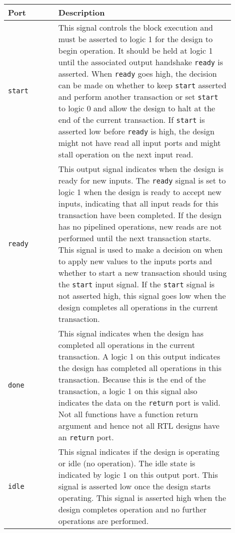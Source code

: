 \begin{table}[H]
\begin{centering}
\begin{tabular}{|p{0.2\linewidth}|p{0.7\linewidth}|}
\hline
\textbf{Port}   & \textbf{Description} \\
\hline
\texttt{start}  &
    This signal controls the block execution and must be asserted to logic 1 for the design to begin operation. It should be held at logic 1 until the associated output handshake \texttt{ready} is asserted. When \texttt{ready} goes high, the decision can be made on whether to keep \texttt{start} asserted and perform another transaction or set \texttt{start} to logic 0 and allow the design to halt at the end of the current transaction. If \texttt{start} is asserted low before \texttt{ready} is high, the design might not have read all input ports and might stall operation on the next input read. \\
\hline
\texttt{ready}  &
    This output signal indicates when the design is ready for new inputs. The \texttt{ready} signal is set to logic 1 when the design is ready to accept new inputs, indicating that all input reads for this transaction have been completed. If the design has no pipelined operations, new reads are not performed until the next transaction starts. This signal is used to make a decision on when to apply new values to the inputs ports and whether to start a new transaction should using the \texttt{start} input signal. If the \texttt{start} signal is not asserted high, this signal goes low when the design completes all operations in the current transaction. \\
\hline
\texttt{done}   &
    This signal indicates when the design has completed all operations in the current transaction. A logic 1 on this output indicates the design has completed all operations in this transaction. Because this is the end of the transaction, a logic 1 on this signal also indicates the data on the \texttt{return} port is valid. Not all functions have a function return argument and hence not all RTL designs have an \texttt{return} port. \\
\hline
\texttt{idle}   & 
    This signal indicates if the design is operating or idle (no operation). The idle state is indicated by logic 1 on this output port. This signal is asserted low once the design starts operating. This signal is asserted high when the design completes operation and no further operations are performed. \\
\hline
\end{tabular}
\end{centering}
\end{table}